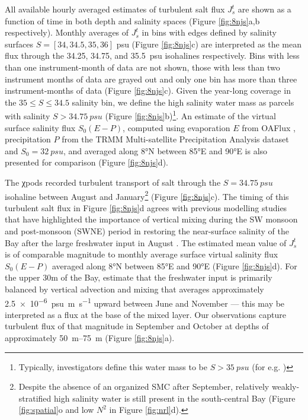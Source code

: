 \documentclass[onecol]{ametsoc}
\begin{document}
All available hourly averaged estimates of turbulent salt flux \(J_s^t\) are shown as a function of time in both depth and salinity spaces (Figure \ref{fig:8njs}a,b respectively).
Monthly averages of \(J_s^t\) in bins with edges defined by salinity surfaces \(S=[34, 34.5, 35, 36]\) \si{psu} (Figure \ref{fig:8njs}c) are interpreted as the mean flux through the 34.25, 34.75, and \SI{35.5}{psu} isohalines respectively.
Bins with less than one instrument-month of data are not shown, those with less than two instrument months of data are grayed out and only one bin has more than three instrument-months of data (Figure \ref{fig:8njs}c).
Given the year-long coverage in the \(35 ≤ S ≤ 34.5\) salinity bin, we define the high salinity water mass as parcels with salinity \(S > \SI{34.75}{psu}\) (Figure \ref{fig:8njs}b)\footnote{Typically, investigators define this water mass to be \(S > \SI{35}{psu}\) (for e.g. \citealp{Vinayachandran2013})}.
An estimate of the virtual surface salinity flux \(S_0(E-P)\), computed using evaporation \(E\) from OAFlux \citep{oaflux}, precipitation \(P\) from the TRMM Multi-satellite Precipitation Analysis dataset \citep{trmm} and \(S_0 = \SI{32}{psu}\), and averaged along 8°N between 85°E and 90°E  is also presented for comparison (Figure \ref{fig:8njs}d).

The χpods recorded turbulent transport of salt through the \(S=\SI{34.75}{psu}\) isohaline between August and January\footnote{Despite the absence of an organized SMC after September, relatively weakly-stratified high salinity water is still present in the south-central Bay (Figure \ref{fig:spatial}o and low \(N^2\) in Figure \ref{fig:nrl}d).} (Figure \ref{fig:8njs}c).
The timing of this turbulent salt flux in Figure \ref{fig:8njs}d agrees with previous modelling studies that have highlighted the importance of vertical mixing during the SW monsoon and post-monsoon (SWNE) period in restoring the near-surface salinity of the Bay after the large freshwater input in August \citep{Benshila2014,Akhil2014,Wilson2016a}.
The estimated mean value of \(J_s^t\) is of comparable magnitude to monthly average surface virtual salinity flux \(S_0(E-P)\) averaged along 8°N between 85°E and 90°E (Figure \ref{fig:8njs}d).
For the upper 30m of the Bay, \cite{Wilson2016a} estimate that the freshwater input is primarily balanced by vertical advection and mixing that averages approximately \SI{2.5e-6}{psu \m\per\s} upward between June and November --- this may be interpreted as a flux at the base of the mixed layer.
Our observations capture turbulent flux of that magnitude in September and October at depths of approximately \SIrange{50}{75}{m} (Figure \ref{fig:8njs}a).
\end{document}
